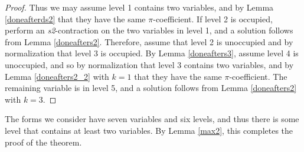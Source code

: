 \documentclass{article}
\begin{document}
\begin{proof}
Thus we may assume level 1 contains two variables, and by Lemma \ref{doneafterds2} that they have the same $\pi$-coefficient.  If level 2 is occupied, perform an \textit{s2}-contraction on the two variables in level 1, and a solution follows from Lemma \ref{doneafters2}.  Therefore, assume that level 2 is unoccupied and by normalization that level 3 is occupied.  By Lemma \ref{doneafters3}, assume level 4 is unoccupied, and so by normalization that level 3 contains two variables, and by Lemma \ref{doneafters2_2} with $k=1$ that they have the same $\pi$-coefficient.  The remaining variable is in level 5, and a solution follows from Lemma \ref{doneafters2} with $k=3$.
\end{proof}

The forms we consider have seven variables and six levels, and thus there is some level that contains at least two variables.  By Lemma \ref{max2}, this completes the proof of the theorem.



\end{document}
